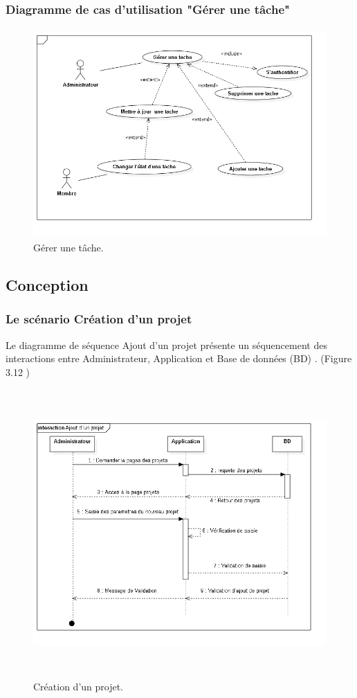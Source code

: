 \subsubsection{ Diagramme de cas d'utilisation "G\'{e}rer une t\^{a}che"}
\begin{figure}[H]
\center
\includegraphics[width=13cm,height=8cm]{./figures/ucT.png}
\caption{G\'{e}rer une t\^{a}che.}

\end{figure}



\subsection{Conception}
\subsubsection{  Le sc\'{e}nario \guillemotleft{} Cr\'{e}ation d'un projet \guillemotright{}}

Le diagramme de s\'{e}quence \guillemotleft{} Ajout d'un projet \guillemotright{} pr\'{e}sente un s\'{e}quencement
des interactions entre Administrateur, Application et Base de donn\'{e}es (BD) . (Figure 3.12 )


\begin{figure}[H]
\center
\includegraphics[width=14cm,height=11cm]{./figures/seq/B.png}
\caption{ Cr\'{e}ation d'un projet.}
\end{figure}

